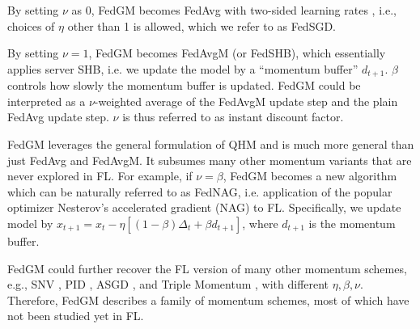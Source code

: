 By setting $\nu$ as 0, FedGM becomes FedAvg with two-sided learning rates \citep{yang2021achieving}, i.e., choices of $\eta$ other than 1 is allowed, which we refer to as FedSGD.

By setting $\nu=1$, FedGM becomes FedAvgM \citep{Hsu2019MeasuringTE} (or FedSHB), which essentially applies server SHB, i.e. we update the model by a ``momentum buffer'' $d_{t+1}$. $\beta$ controls how slowly the momentum buffer is updated. FedGM could be interpreted as a $\nu$-weighted average of the FedAvgM update step and the plain FedAvg update step. $\nu$ is thus referred to as instant discount factor. 

FedGM leverages the general formulation of QHM \citep{ma2018quasihyperbolic} and is much more general than just FedAvg and FedAvgM. It subsumes many other momentum variants that are never explored in FL. For example, if $\nu=\beta$, FedGM becomes a new algorithm which can be naturally referred to as FedNAG, i.e. application of the popular optimizer Nesterov's accelerated gradient (NAG) to FL. Specifically, we update model by $x_{t+1}=x_t-\eta\left[(1-\beta)\Delta_{t}+\beta d_{t+1}\right]$, where $d_{t+1}$ is the momentum buffer.

FedGM could further recover the FL version of many other momentum schemes, e.g., SNV \citep{Lessard14SNV}, PID \citep{An18PID}, ASGD \citep{Kidambi18Insufficiency}, and Triple Momentum \citep{VanScoy18Triple}, with different $\eta,\beta,\nu$. Therefore, FedGM describes a family of momentum schemes, most of which have not been studied yet in FL.



